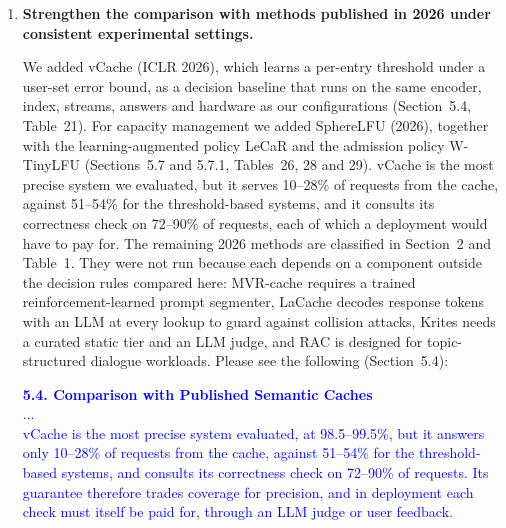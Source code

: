 \documentclass[11pt]{article}
\begin{document}
\begin{enumerate}[leftmargin=*, itemsep=1.2em]
\textcolor{blue}{\textbf{5.2.2. Latency Breakdown}\\
Table~9 isolates the cost of each component in a test-bench setting, in which 300 batch-size-1 queries are issued against a fixed 2,000-vector index on the server described in Section~3.5. Bi-encoding takes 6.89~ms and the FAISS lookup 0.32~ms, so the decision path of C1 costs 7.22~ms. The cross-encoder adds 11.50~ms per request and is the largest single stage, accounting for 61\% of the cost of C3 and 53\% of that of C4. Feature extraction and LightGBM inference together add 2.93~ms, of which feature computation takes less than 0.1~ms; the cheap features are therefore almost free, and their cost is essentially that of the meta-classifier. The full configuration C4 consequently costs 3.0 times as much as C1 and 2.1 times as much as C2. At their default thresholds, the 11.5~ms that C4 adds to C2 raises hit precision by 0.3 points, a difference that is not significant across the five evaluation streams (paired $t$-test, $p=0.35$).}

\item \textbf{Strengthen the comparison with methods published in 2026 under consistent experimental settings.}

We added vCache (ICLR 2026), which learns a per-entry threshold under a user-set error bound, as a decision baseline that runs on the same encoder, index, streams, answers and hardware as our configurations (Section~5.4, Table~21). For capacity management we added SphereLFU (2026), together with the learning-augmented policy LeCaR and the admission policy W-TinyLFU (Sections~5.7 and 5.7.1, Tables~26, 28 and 29). vCache is the most precise system we evaluated, but it serves 10--28\% of requests from the cache, against 51--54\% for the threshold-based systems, and it consults its correctness check on 72--90\% of requests, each of which a deployment would have to pay for. The remaining 2026 methods are classified in Section~2 and Table~1. They were not run because each depends on a component outside the decision rules compared here: MVR-cache requires a trained reinforcement-learned prompt segmenter, LaCache decodes response tokens with an LLM at every lookup to guard against collision attacks, Krites needs a curated static tier and an LLM judge, and RAC is designed for topic-structured dialogue workloads. Please see the following (Section~5.4):

\textcolor{blue}{\textbf{5.4. Comparison with Published Semantic Caches}\\
...\\
vCache is the most precise system evaluated, at 98.5--99.5\%, but it answers only 10--28\% of requests from the cache, against 51--54\% for the threshold-based systems, and consults its correctness check on 72--90\% of requests. Its guarantee therefore trades coverage for precision, and in deployment each check must itself be paid for, through an LLM judge or user feedback.}


\end{enumerate}
\end{document}
